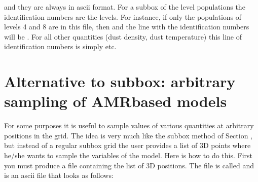 \documentclass[letterpaper,10pt,english]{sphinxmanual}
\begin{document}
\begin{sphinxVerbatim}[commandchars=\\\{\}]
\PYG{p}{[}\PYG{p}{]}
\PYG{p}{[}\PYG{p}{]}
                                             
                                             
\PYG{p}{[}\PYG{p}{]}
\PYG{p}{[}\PYG{p}{]}
\end{sphinxVerbatim}

and they are always in ascii format. For a subbox of the level populations the
identification numbers are the levels. For instance, if only the populations of
levels 4 and 8 are in this file, then  and the line with
the identification numbers will be . For all other quantities
(dust density, dust temperature) this line of identification numbers is simply
 etc.


\section{Alternative to subbox: arbitrary sampling of AMR\sphinxhyphen{}based models}
\label{\detokenize{toolsinside:alternative-to-subbox-arbitrary-sampling-of-amr-based-models}}\label{\detokenize{toolsinside:sec-sampling}}
For some purposes it is useful to sample values of various quantities at
arbitrary positions in the grid. The idea is very much like the subbox
method of Section {\hyperref[\detokenize{toolsinside:sec-subbox}]{}}, but instead of a regular subbox grid
the user provides a list of 3\sphinxhyphen{}D points where he/she wants to sample the
variables of the model. Here is how to do this. First you must produce
a file containing the list of 3\sphinxhyphen{}D positions. The file is called
 and is an ascii file that looks as
follows:
\end{document}

